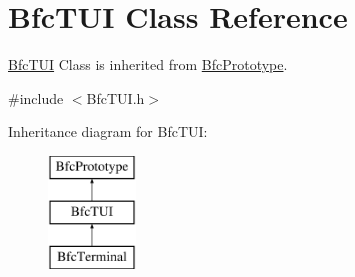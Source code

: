 \hypertarget{classBfcTUI}{\section{Bfc\-T\-U\-I Class Reference}
\label{classBfcTUI}
}


\hyperlink{classBfcTUI}{Bfc\-T\-U\-I} Class is inherited from \hyperlink{classBfcPrototype}{Bfc\-Prototype}.  




{\ttfamily \#include $<$Bfc\-T\-U\-I.\-h$>$}

Inheritance diagram for Bfc\-T\-U\-I\-:\begin{figure}[H]
\begin{center}
\leavevmode
\includegraphics[height=3.000000cm]{classBfcTUI}
\end{center}
\end{figure}

